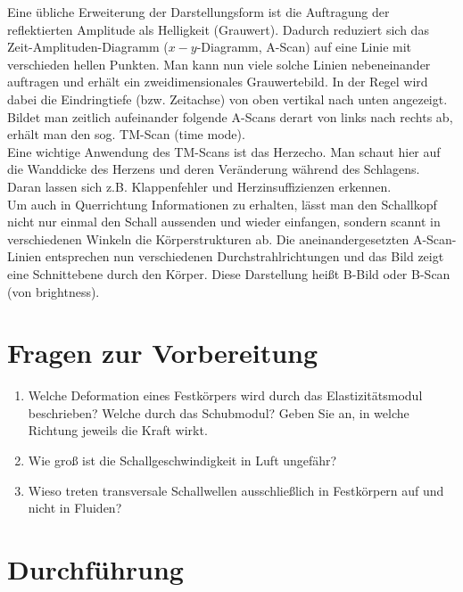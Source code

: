 \noindent
Eine übliche Erweiterung der Darstellungsform ist die Auftragung der reflektierten Amplitude als Helligkeit (Grauwert). Dadurch reduziert sich das Zeit-Amplituden-Diagramm ($x-y$-Diagramm, A-Scan) auf eine Linie mit verschieden hellen Punkten. Man kann nun viele solche Linien nebeneinander auftragen und erhält ein zweidimensionales Grauwertebild. In der Regel wird dabei die Eindringtiefe (bzw. Zeitachse) von oben vertikal nach unten angezeigt. Bildet man zeitlich aufeinander folgende A-Scans derart von links nach rechts ab, erhält man den sog. TM-Scan
(time mode).\\
Eine wichtige Anwendung des TM-Scans ist das Herzecho. Man schaut hier auf die Wanddicke des Herzens und deren Veränderung während des Schlagens. Daran lassen sich z.B. Klappenfehler und Herzinsuffizienzen erkennen.\\

\noindent
Um auch in Querrichtung Informationen zu erhalten, lässt man den Schallkopf nicht nur einmal den Schall aussenden und wieder einfangen, sondern scannt in verschiedenen Winkeln die Körperstrukturen ab. Die aneinandergesetzten A-Scan-Linien entsprechen nun verschiedenen Durchstrahlrichtungen und das Bild zeigt eine Schnittebene durch den Körper. Diese Darstellung heißt B-Bild oder B-Scan (von
brightness).

\section{Fragen zur Vorbereitung}

\begin{enumerate} 
	\item Welche Deformation eines Festkörpers wird durch das Elastizitätsmodul beschrieben? Welche durch das Schubmodul? Geben Sie an, in welche Richtung jeweils die Kraft wirkt.
	\item Wie groß ist die Schallgeschwindigkeit in Luft ungefähr?
	\item Wieso treten transversale Schallwellen ausschließlich in Festkörpern auf und nicht in Fluiden?
\end{enumerate} 

\section{Durchführung} 

